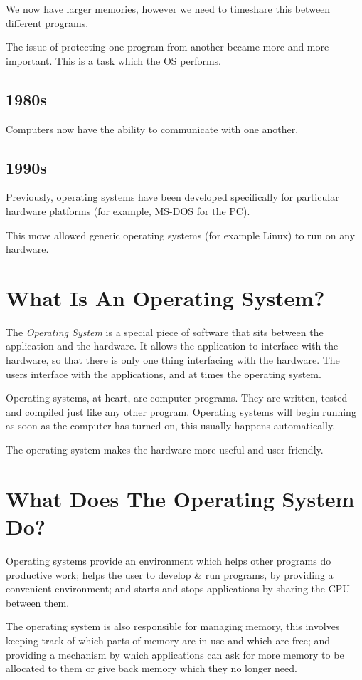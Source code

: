 We now have larger memories, however we need to timeshare this between different programs.

The issue of protecting one program from another became more and more important. This is a task which the OS performs. 

\subsection{1980s}
Computers now have the ability to communicate with one another. 

\subsection{1990s}
Previously, operating systems have been developed specifically for particular hardware platforms (for example, MS-DOS for the PC).

This move allowed generic operating systems (for example Linux) to run on any hardware. 

\section{What Is An Operating System?}
The \textit{Operating System} is a special piece of software that sits between the application and the hardware. It allows the application to interface with the hardware, so that there is only one thing interfacing with the hardware. The users interface with the applications, and at times the operating system.

Operating systems, at heart, are computer programs. They are written, tested and compiled just like any other program. Operating systems will begin running as soon as the computer has turned on, this usually happens automatically. 

The operating system makes the hardware more useful and user friendly.

\section{What Does The Operating System Do?}
Operating systems provide an environment which helps other programs do productive work; helps the user to develop \& run programs, by providing a convenient environment; and starts and stops applications by sharing the CPU between them.

The operating system is also responsible for managing memory, this involves keeping track of which parts of memory are in use and which are free; and providing a mechanism by which applications can ask for more memory to be allocated to them or give back memory which they no longer need.

